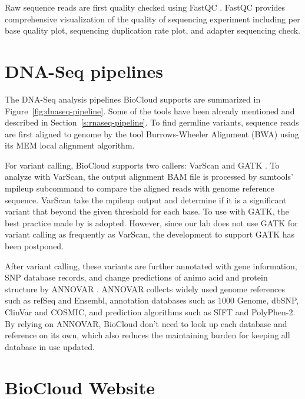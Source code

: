 Raw sequence reads are first quality checked using FastQC \cite{:fastqc}.
FastQC provides comprehensive visualization of the quality of sequencing
experiment including per base quality plot, sequencing duplication rate plot,
and adapter sequencing check.



\section{DNA-Seq pipelines}
\label{s:dnaseq-pipeline}

The DNA-Seq analysis pipelines BioCloud supports are summarized in
Figure~\ref{fig:dnaseq-pipeline}. Some of the tools have been already mentioned
and described in Section~\ref{s:rnaseq-pipeline}. To find germline variants,
sequence reads are first aligned to genome by the tool Burrows-Wheeler
Alignment (BWA) \cite{li2009:fast} using its MEM local alignment algorithm.



For variant calling, BioCloud supports two callers: VarScan
\cite{koboldt2012:varscan} and GATK
\cite{vanderauwera2013:fastq,mckenna2010:genome}. To analyze with VarScan, the
output alignment BAM file is processed by samtools' mpileup subcommand to
compare the aligned reads with genome reference sequence. VarScan take the
mpileup output and determine if it is a significant variant that beyond the
given threshold for each base. To use with GATK, the best practice
\cite{vanderauwera2013:fastq} made by \citeauthor{vanderauwera2013:fastq} is
adopted. However, since our lab does not use GATK for variant calling as
frequently as VarScan, the development to support GATK has been postponed.

After variant calling, these variants are further annotated with gene
information, SNP database records, and change predictions of animo acid and
protein structure by ANNOVAR \cite{wang2010:annovar}. ANNOVAR collects widely
used genome references such as refSeq and Ensembl, annotation databases such as
1000 Genome, dbSNP, ClinVar and COSMIC, and prediction algorithms such as SIFT
and PolyPhen-2. By relying on ANNOVAR, BioCloud don't need to look up each
database and reference on its own, which also reduces the maintaining burden
for keeping all database in use updated.



\section{BioCloud Website}
\label{s:biocloud-website}

